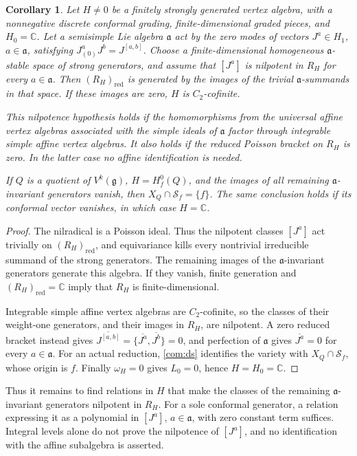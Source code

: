 \documentclass[11pt,a4paper]{amsart}
\numberwithin{equation}{section}
\newtheorem{corollary}[theorem]{Corollary}
\theoremstyle{definition}
\theoremstyle{remark}
\newcommand{\C}{\mathbb C}
\newcommand{\g}{\mathfrak g}
\begin{document}
\begin{corollary}\label{com:scalar-point}
Let $H\ne0$ be a finitely strongly generated vertex algebra, with a
nonnegative discrete conformal grading, finite-dimensional graded pieces,
and $H_0=\C$. Let a semisimple Lie algebra $\mathfrak a$ act by the zero modes of
vectors $J^a\in H_1$, $a\in\mathfrak a$, satisfying
$J^a_{(0)}J^b=J^{[a,b]}$. Choose a finite-dimensional
homogeneous $\mathfrak a$-stable space of strong generators, and assume
that $[J^a]$ is nilpotent in $R_H$ for every $a\in\mathfrak a$.
Then $(R_H)_{\mathrm{red}}$ is generated by the images of the trivial
$\mathfrak a$-summands in that space. If these images are zero, $H$ is
$C_2$-cofinite.

This nilpotence hypothesis holds if the homomorphisms from the
universal affine vertex algebras associated with the simple ideals of $\mathfrak a$
factor through integrable simple affine vertex algebras. It also holds
if the reduced Poisson bracket on $R_H$ is zero. In the latter case
no affine identification is needed.

If $Q$ is a quotient of $V^k(\g)$, $H=H_f^0(Q)$, and
the images of all remaining $\mathfrak a$-invariant generators vanish, then
$X_Q\cap\mathcal S_f=\{f\}$. The same conclusion holds
if its conformal vector vanishes, in which case $H=\C$.
\end{corollary}
\begin{proof}
The nilradical is a Poisson ideal. Thus the nilpotent classes $[J^a]$
act trivially on $(R_H)_{\mathrm{red}}$, and equivariance kills every
nontrivial irreducible summand of the strong generators. The remaining
images of the $\mathfrak a$-invariant generators generate this algebra. If they vanish, finite generation
and $(R_H)_{\mathrm{red}}=\C$ imply that $R_H$ is finite-dimensional.

Integrable simple affine vertex algebras are $C_2$-cofinite, so the classes of their weight-one generators, and their images in $R_H$, are nilpotent. A zero reduced
bracket instead gives
$\overline{J^{[a,b]}}=\{\overline{J^a},\overline{J^b}\}=0$,
and perfection of $\mathfrak a$ gives $\overline{J^a}=0$ for every $a\in\mathfrak a$.
For an actual reduction, \cref{com:ds} identifies the variety with
$X_Q\cap\mathcal S_f$, whose origin is $f$.
Finally $\omega_H=0$ gives $L_0=0$, hence $H=H_0=\C$.
\end{proof}

Thus it remains to find relations in $H$ that make the classes of
the remaining $\mathfrak a$-invariant generators nilpotent in $R_H$. For a sole conformal generator, a relation expressing
it as a polynomial in $[J^a]$, $a\in\mathfrak a$, with zero constant term
suffices. Integral levels alone do not prove the nilpotence of $[J^a]$, and
no identification with the affine subalgebra is asserted.
\end{document}
